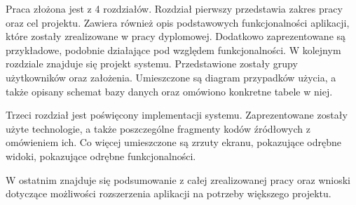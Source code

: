 \documentclass[10pt,titlepage]{article}
\begin{document}
\par Praca złożona jest z 4 rozdziałów. Rozdział pierwszy przedstawia zakres pracy oraz cel projektu. Zawiera również opis podstawowych funkcjonalności aplikacji, które zostały zrealizowane w pracy dyplomowej. Dodatkowo zaprezentowane są przykładowe, podobnie działające pod względem funkcjonalności.
W kolejnym rozdziale znajduje się projekt systemu. Przedstawione zostały grupy użytkowników oraz założenia. Umieszczone są diagram przypadków użycia, a także opisany schemat bazy danych oraz omówiono konkretne tabele w niej.
\par Trzeci rozdział jest poświęcony implementacji systemu. Zaprezentowane zostały użyte technologie, a także poszczególne fragmenty kodów źródłowych z omówieniem ich. Co więcej umieszczone są zrzuty ekranu, pokazujące odrębne widoki, pokazujące odrębne funkcjonalności.
\par W ostatnim znajduje się podsumowanie z całej zrealizowanej pracy oraz wnioski dotyczące możliwości rozszerzenia aplikacji na potrzeby większego projektu.
\end{document}
